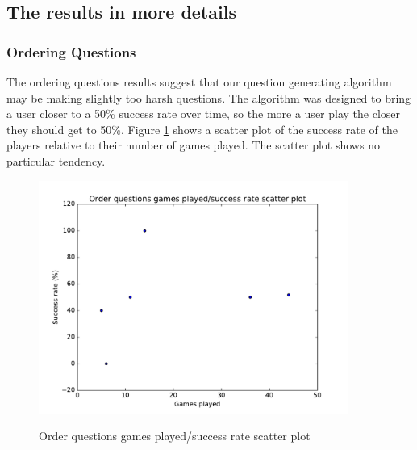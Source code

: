\subsection{The results in more details}
\subsubsection{Ordering Questions}
The ordering questions results suggest that our question generating algorithm may be making slightly too harsh questions. The algorithm was designed to bring a user closer to a 50\% success rate over time, so the more a user play the closer they should get to 50\%. Figure \ref{fig:ordScatter} shows a scatter plot of the success rate of the players relative to their number of games played. The scatter plot shows no particular tendency.

\begin{figure}
\centering
{\includegraphics[width=4in]{images/order_scatter.pdf}}
\caption{Order questions games played/success rate scatter plot}
\label{fig:ordScatter}
\end{figure}

